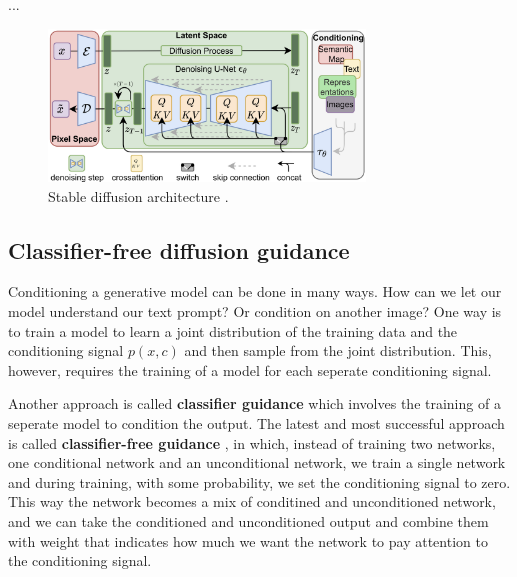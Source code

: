 ...
\begin{figure}
    \centering
    \includegraphics[width=0.75\textwidth]{images/diffusion_models/stable_diffusion/architecture.png}
    \caption{Stable diffusion architecture \cite{stable_diffusion}.}
\end{figure}










\subsection{Classifier-free diffusion guidance}

\label{subsec:classifier_free_diffusion_guidance}

Conditioning a generative model can be done in many ways. How can we let our model understand our text prompt? Or condition on another image? One way is to train a model to learn a joint distribution of the training data and the conditioning signal $p(x,c)$ and then sample from the joint distribution. This, however, requires the training of a model for each seperate conditioning signal.

Another approach is called \textbf{classifier guidance} \cite{openai_diffusion_beats_gans} which involves the training of a seperate model to condition the output. The latest and most successful approach is called \textbf{classifier-free guidance} \cite{classifier_free_guidance}, in which, instead of training two networks, one conditional network and an unconditional network, we train a single network and during training, with some probability, we set the conditioning signal to zero. This way the network becomes a mix of conditined and unconditioned network, and we can take the conditioned and unconditioned output and combine them with weight that indicates how much we want the network to pay attention to the conditioning signal.








